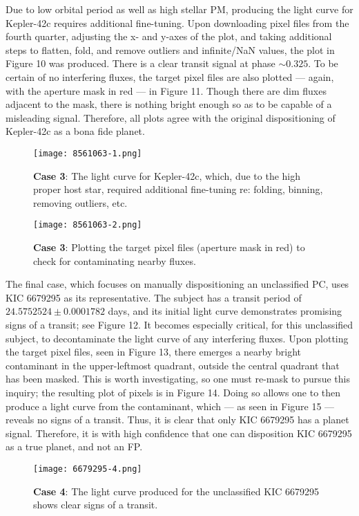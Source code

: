 \documentclass[onecolumn, 12pt]{article}
\begin{document}
Due to low orbital period as well as high stellar PM, producing the light curve for Kepler-42c requires additional fine-tuning. Upon downloading pixel files from the fourth quarter, adjusting the x- and y-axes of the plot, and taking additional steps to flatten, fold, and remove outliers and infinite/NaN values, the plot in Figure 10 was produced. There is a clear transit signal at phase $\sim 0.325$. To be certain of no interfering fluxes, the target pixel files are also plotted — again, with the aperture mask in red — in Figure 11. Though there are dim fluxes adjacent to the mask, there is nothing bright enough so as to be capable of a misleading signal. Therefore, all plots agree with the original dispositioning of Kepler-42c as a bona fide planet.

\begin{figure}[p]
\centering
\texttt{[image: 8561063-1.png]}
\caption{\textbf{Case 3}: The light curve for Kepler-42c, which, due to the high proper host star, required additional fine-tuning re: folding, binning, removing outliers, etc.}
\end{figure}

\begin{figure}[p]
\centering
\texttt{[image: 8561063-2.png]}
\caption{\textbf{Case 3}: Plotting the target pixel files (aperture mask in red) to check for contaminating nearby fluxes.}
\end{figure}

The final case, which focuses on manually dispositioning an unclassified PC, uses KIC 6679295 as its representative. The subject has a transit period of $24.5752524 \pm 0.0001782$ days, and its initial light curve demonstrates promising signs of a transit; see Figure 12. It becomes especially critical, for this unclassified subject, to decontaminate the light curve of any interfering fluxes. Upon plotting the target pixel files, seen in Figure 13, there emerges a nearby bright contaminant in the upper-leftmost quadrant, outside the central quadrant that has been masked. This is worth investigating, so one must re-mask to pursue this inquiry; the resulting plot of pixels is in Figure 14. Doing so allows one to then produce a light curve from the contaminant, which — as seen in Figure 15 — reveals no signs of a transit. Thus, it is clear that only KIC 6679295 has a planet signal. Therefore, it is with high confidence that one can disposition KIC 6679295 as a true planet, and not an FP.

\begin{figure}[p]
\centering
\texttt{[image: 6679295-4.png]}
\caption{\textbf{Case 4}: The light curve produced for the unclassified KIC 6679295 shows clear signs of a transit.}
\end{figure}
\end{document}
